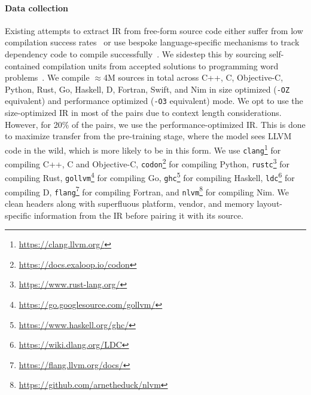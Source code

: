 \documentclass[10pt]{article} %
\begin{document}
\paragraph{Data collection} Existing attempts to extract IR from free-form source code either suffer from low compilation success rates~\citep{szafraniec2023code} or use bespoke language-specific mechanisms to track dependency code to compile successfully~\citep{grossman2023compile}. We sidestep this by sourcing self-contained compilation units from accepted solutions to programming word problems~\citep{rosetta-code, codeforces2020, puri2021codenet, Caballero_Description2Code_Dataset_2016}. We compile $\approx$4M sources in total across C++, C, Objective-C, Python, Rust, Go, Haskell, D, Fortran, Swift, and Nim in size optimized (\texttt{-OZ} equivalent) and performance optimized (\texttt{-O3} equivalent) mode. We opt to use the size-optimized IR in most of the pairs due to context length considerations. However, for 20\% of the pairs, we use the performance-optimized IR. This is done to maximize transfer from the pre-training stage, where the model sees LLVM code in the wild, which is more likely to be in this form.  We use \texttt{clang}\footnote{\href{https://clang.llvm.org/}{https://clang.llvm.org/}} for compiling C++, C and Objective-C, \texttt{codon}\footnote{\href{https://docs.exaloop.io/codon}{https://docs.exaloop.io/codon}} for compiling Python, \texttt{rustc}\footnote{\href{https://www.rust-lang.org/}{https://www.rust-lang.org/}} for compiling Rust, \texttt{gollvm}\footnote{\href{https://go.googlesource.com/gollvm/}{https://go.googlesource.com/gollvm/}} for compiling Go, \texttt{ghc}\footnote{\href{https://www.haskell.org/ghc/}{https://www.haskell.org/ghc/}} for compiling Haskell, \texttt{ldc}\footnote{\href{https://wiki.dlang.org/LDC}{https://wiki.dlang.org/LDC}} for compiling D, \texttt{flang}\footnote{\href{https://flang.llvm.org/docs/}{https://flang.llvm.org/docs/}} for compiling Fortran, and \texttt{nlvm}\footnote{\href{https://github.com/arnetheduck/nlvm}{https://github.com/arnetheduck/nlvm}} for compiling Nim. We clean headers along with superfluous platform, vendor, and memory layout-specific information from the IR before pairing it with its source.
\end{document}
